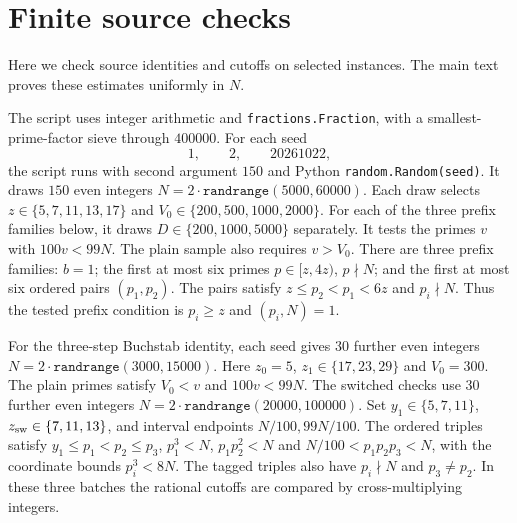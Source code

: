 \section{Finite source checks}\label{app:finite-source-checks}

Here we check source identities and cutoffs on selected instances.
The main text proves these estimates uniformly in $N$.

The script uses integer arithmetic and \texttt{fractions.Fraction},
with a smallest-prime-factor sieve through $400000$.
For each seed
\[
  1,\qquad 2,\qquad 20261022,
\]
the script runs with second argument $150$ and Python \texttt{random.Random(seed)}.
It draws $150$ even integers
$N=2\cdot\texttt{randrange}(5000,60000)$. Each draw selects
$z\in\{5,7,11,13,17\}$ and $V_0\in\{200,500,1000,2000\}$.
For each of the three prefix families below, it draws
$D\in\{200,1000,5000\}$ separately.
It tests the primes $v$ with
$100v<99N$. The plain sample also requires $v>V_0$.
There are three prefix families:
$b=1$; the first at most six primes $p\in[z,4z)$, $p\nmid N$;
and the first at most six ordered pairs $(p_1,p_2)$.
The pairs satisfy $z\le p_2<p_1<6z$ and $p_i\nmid N$.
Thus the tested prefix condition is $p_i\ge z$ and $(p_i,N)=1$.

For the three-step Buchstab identity, each seed gives $30$ further even integers
$N=2\cdot\texttt{randrange}(3000,15000)$. Here $z_0=5$,
$z_1\in\{17,23,29\}$ and $V_0=300$.
The plain primes satisfy $V_0<v$ and $100v<99N$.
The switched checks use $30$ further even integers
$N=2\cdot\texttt{randrange}(20000,100000)$.
Set $y_1\in\{5,7,11\}$, $z_{\rm sw}\in\{7,11,13\}$,
and interval endpoints $N/100,99N/100$.
The ordered triples satisfy
$y_1\le p_1<p_2\le p_3$, $p_1^3<N$, $p_1p_2^2<N$ and
$N/100<p_1p_2p_3<N$, with the coordinate bounds $p_i^3<8N$.
The tagged triples also have $p_i\nmid N$
and $p_3\ne p_2$. In these three batches the rational cutoffs are compared
by cross-multiplying integers.

